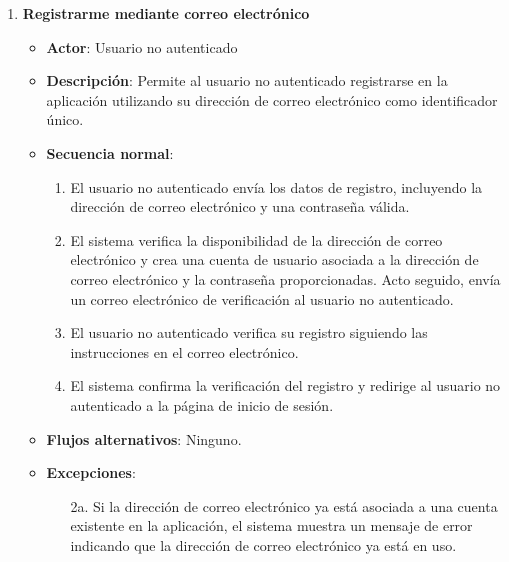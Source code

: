 \begin{enumerate}[label=UC-\protect\twodigits{\arabic*}:, align=left, leftmargin=*]
\item \textbf{Registrarme mediante correo electrónico}
\begin{itemize}
\item \textbf{Actor}: Usuario no autenticado
\item \textbf{Descripción}: Permite al usuario no autenticado registrarse en la aplicación utilizando su dirección de correo electrónico como identificador único.
\item \textbf{Secuencia normal}:
\begin{enumerate}[label={\arabic*}:]
\item El usuario no autenticado envía los datos de registro, incluyendo la dirección de correo electrónico y una contraseña válida.
\item El sistema verifica la disponibilidad de la dirección de correo electrónico y crea una cuenta de usuario asociada a la dirección de correo electrónico y la contraseña proporcionadas. Acto seguido, envía un correo electrónico de verificación al usuario no autenticado.
\item El usuario no autenticado verifica su registro siguiendo las instrucciones en el correo electrónico.
\item El sistema confirma la verificación del registro y redirige al usuario no autenticado a la página de inicio de sesión.
\end{enumerate}
\item \textbf{Flujos alternativos}: Ninguno.
\item \textbf{Excepciones}:
\begin{itemize}
\item[2a.] Si la dirección de correo electrónico ya está asociada a una cuenta existente en la aplicación, el sistema muestra un mensaje de error indicando que la dirección de correo electrónico ya está en uso.
\end{itemize}
\end{itemize}


\end{enumerate}
